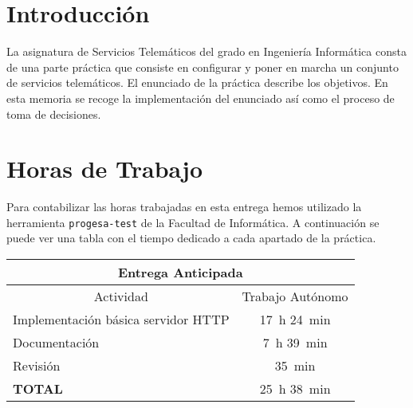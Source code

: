 \documentclass[12pt, onside]{article}
\newcommand{\key}{\texttt}
\newcommand{\HTTP}{HTTP}
\begin{document}

\newpage
\tableofcontents
\newpage

\section{Introducción}
La asignatura de Servicios Telemáticos del grado en Ingeniería Informática consta de una parte práctica que consiste en configurar y poner en marcha un conjunto de servicios telemáticos. El enunciado de la práctica %
describe los objetivos. En esta memoria se recoge la implementación del enunciado así como el proceso de toma de decisiones.





\section{Horas de Trabajo}
Para contabilizar las horas trabajadas en esta entrega hemos utilizado la herramienta \key{progesa-test} de la Facultad de Informática. A continuación se puede ver una tabla con el tiempo dedicado a cada apartado de la práctica.

\begin{center}
\begin{tabular}{|p{5cm}|c|}
    \hline
    \multicolumn{2}{|c|}{Entrega Anticipada} \\
    \hline\hline
    \multicolumn{1}{|c|}{Actividad} & Trabajo Autónomo \\
    \hline
    Implementación básica servidor {\HTTP} & \SI{17}{\hour} \SI{24}{\minute} \\
    \hline
    Documentación & \phantom{9}\SI{7}{\hour} \SI{39}{\minute} \\
    \hline
    Revisión & \phantom{\SI{99}{\hour}} \SI{35}{\minute} \\
    \hline
    \textbf{TOTAL} & \SI{25}{\hour} \SI{38}{\minute} \\ \hline
\end{tabular}
\end{center}


\end{document}
